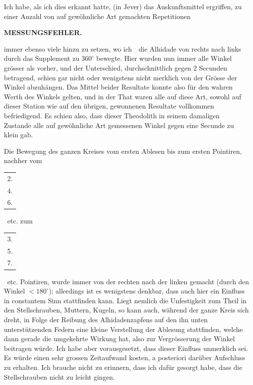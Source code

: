\par\noindent\hspace*{\parindent}Ich habe, als ich dies erkannt hatte, (in Jever) das Auskunftsmittel ergriffen, zu einer Anzahl von auf gewöhnliche Art gemachten Repetitionen

\par\clearpage
\noindent\null\hfill{\small\textbf{MESSUNGSFEHLER.}}\hfill{}\par\medskip
\noindent immer ebenso viele hinzu zu setzen, wo ich\ \ die Alhidade von rechts nach links durch das Supplement zu $360^\circ$ bewegte. Hier wurden nun immer alle Winkel grösser als vorher, und der Unterschied, durchschnittlich gegen 2 Secunden betragend, schien gar nicht oder wenigstens nicht merklich von der Grösse der Winkel abzuhängen. Das Mittel beider Resultate konnte also für den wahren Werth des Winkels gelten, und in der That waren alle auf diese Art, sowohl auf dieser Station wie auf den übrigen, gewonnenen Resultate vollkommen befriedigend. Es schien also, dass dieser Theodolith in seinem damaligen Zustande alle auf gewöhnliche Art gemessenen Winkel gegen eine Secunde zu klein gab.

\par\noindent\hspace*{\parindent}Die Bewegung des ganzen Kreises vom ersten Ablesen bis zum ersten\linebreak
Pointiren, nachher vom \begin{tabular}[c]{@{}c@{}}2.\\4.\\6.\end{tabular}\ etc. zum \begin{tabular}[c]{@{}c@{}}3.\\5.\\7.\end{tabular}\ etc. Pointiren, wurde immer von der\linebreak
rechten nach der linken gemacht (durch den Winkel $<180^\circ$); allerdings ist es wenigstens denkbar, dass auch hier ein Einfluss in constantem Sinn stattfinden kann. Liegt nemlich die Unfestigkeit zum Theil in den Stellschrauben, Muttern, Kugeln, so kann auch, während der ganze Kreis sich dreht, in Folge der Reibung des Alhidadenzapfens auf den ihn unten unterstützenden Federn eine kleine Verstellung der Ablesung stattfinden, welche dann gerade die umgekehrte Wirkung hat, also zur Vergrösserung der Winkel beitragen würde. Ich habe aber vorausgesetzt, dass dieser Einfluss unmerklich sei. Es würde einen sehr grossen Zeitaufwand kosten, a posteriori darüber Aufschluss zu erhalten. Ich brauche nicht zu erinnern, dass ich  dafür gesorgt habe, dass die Stellschrauben nicht zu leicht gingen.

